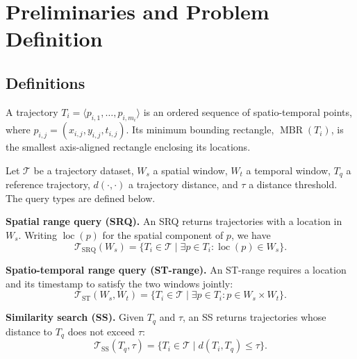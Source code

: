 \section{Preliminaries and Problem Definition}\label{sec:preliminaries}
\subsection{Definitions}\label{sec:definitions}

\begin{kartdefinition}[Trajectory]
A trajectory $T_i=\langle p_{i,1},\ldots,p_{i,m_i}\rangle$ is an ordered sequence of spatio-temporal points, where $p_{i,j}=(x_{i,j},y_{i,j},t_{i,j})$.
  Its minimum bounding rectangle, $\operatorname{MBR}(T_i)$, is the smallest axis-aligned rectangle enclosing its locations.
\end{kartdefinition}

\begin{kartdefinition}
Let $\mathcal{T}$ be a trajectory dataset, $W_s$ a spatial window, $W_t$ a temporal window, $T_q$ a reference trajectory, $d(\cdot,\cdot)$ a trajectory distance, and $\tau$ a distance threshold.
  The query types are defined below.
\end{kartdefinition}

\noindent\textbf{Spatial range query (SRQ).}
An SRQ returns trajectories with a location in $W_s$.
  Writing $\operatorname{loc}(p)$ for the spatial component of $p$, we have
\begin{equation}\label{eq:srq}
\mathcal{T}_{\mathrm{SRQ}}(W_s)
=\{T_i\in\mathcal{T}\mid \exists p\in T_i:\operatorname{loc}(p)\in W_s\}.
\end{equation}

\noindent\textbf{Spatio-temporal range query (ST-range).}
An ST-range requires a location and its timestamp to satisfy the two windows jointly:
\begin{equation}\label{eq:strange}
\mathcal{T}_{\mathrm{ST}}(W_s,W_t)
=\{T_i\in\mathcal{T}\mid \exists p\in T_i:p\in W_s\times W_t\}.
\end{equation}

\noindent\textbf{Similarity search (SS).}
Given $T_q$ and $\tau$, an SS returns trajectories whose distance to $T_q$ does not exceed $\tau$:
\begin{equation}\label{eq:ss}
\mathcal{T}_{\mathrm{SS}}(T_q,\tau)
=\{T_i\in\mathcal{T}\mid d(T_i,T_q)\le\tau\}.
\end{equation}

